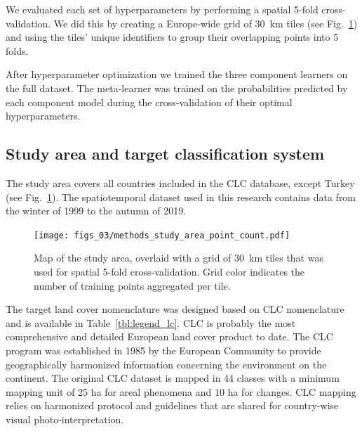     We evaluated each set of hyperparameters by performing a spatial 5-fold cross-validation. We did this by creating a Europe-wide grid of 30~km tiles (see Fig.\@~\ref{fig:study_area_point_count}) and using the tiles' unique identifiers to group their overlapping points into 5 folds.
    
    After hyperparameter optimization we trained the three component learners on the full dataset. The meta-learner was trained on the probabilities predicted by each component model during the cross-validation of their optimal hyperparameters.

\subsection*{Study area and target classification system}
    
    The study area covers all countries included in the CLC database, except Turkey (see Fig.\@~\ref{fig:study_area_point_count}). The spatiotemporal dataset used in this research contains data from the winter of 1999 to the autumn of 2019.
    
    \begin{figure}[!hbt]
    \centering
    \texttt{[image: figs\_03/methods\_study\_area\_point\_count.pdf]}
    \caption{Map of the study area, overlaid with a grid of 30~km tiles that was used for spatial 5-fold cross-validation. Grid color indicates the number of training points aggregated per tile.}
    \label{fig:study_area_point_count}
    \end{figure}
    
    The target land cover nomenclature was designed based on CLC nomenclature \citep{bossard2000} and is available in Table\@~\ref{tbl:legend_lc}. CLC is probably the most comprehensive and detailed European land cover product to date. The CLC program was established in 1985 by the European Community to provide geographically harmonized information concerning the environment on the continent. The original CLC dataset is mapped in 44 classes with a minimum mapping unit of 25 ha for areal phenomena and 10 ha for changes. CLC mapping relies on harmonized protocol and guidelines that are shared for country-wise visual photo-interpretation. 
    
